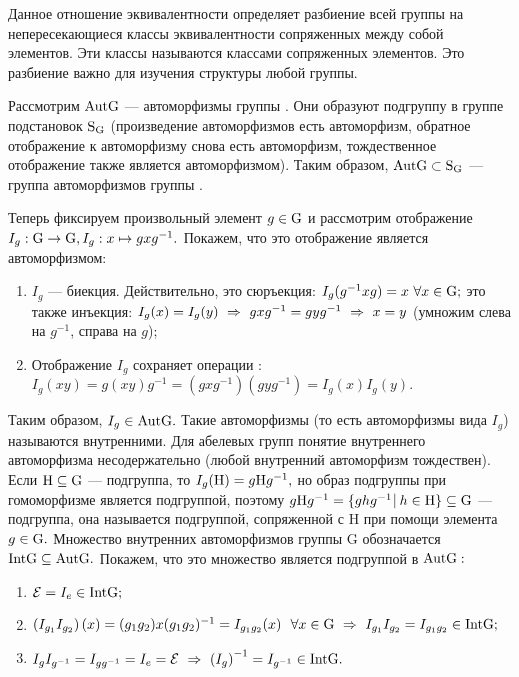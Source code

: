 \par Данное отношение эквивалентности определяет разбиение всей группы  на непересекающиеся классы эквивалентности сопряженных между собой элементов.
Эти классы называются классами сопряженных элементов. Это разбиение важно для изучения структуры любой группы.
\par Рассмотрим ${\rm Aut G}$ --- автоморфизмы группы . Они образуют подгруппу в группе подстановок ${\rm S_G}$ (произведение автоморфизмов есть автоморфизм,
обратное отображение к автоморфизму снова есть автоморфизм, тождественное отображение также является автоморфизмом). Таким образом,
${\rm Aut G}\subset{\rm S_G}$ --- группа автоморфизмов группы .
\par Теперь фиксируем произвольный элемент $g\in{\rm G}$ и рассмотрим отображение $I_g : {\rm G}\rightarrow {\rm G},\\ I_g : x\mapsto gxg^{-1}.$
Покажем, что это отображение является автоморфизмом:
\begin{enumerate}
    \item $I_g$ --- биекция.
    Действительно, это сюръекция: $I_g(g^{-1}xg)=x\ \forall x\in{\rm G};$ это также инъекция: $I_g(x)=I_g(y)\ \Rightarrow\  gxg^{-1}=gyg^{-1}\ \Rightarrow\  x=y$ (умножим слева на $g^{-1}$, справа на $g$);
    \item Отображение $I_g$ сохраняет операции : $I_g(xy)=g(xy)g^{-1}=(gxg^{-1})(gyg^{-1})=I_g(x)I_g(y).$
\end{enumerate}
\par Таким образом, $I_g\in {\rm Aut G}.$ Такие автоморфизмы (то есть автоморфизмы вида $I_g$) называются внутренними. Для абелевых групп понятие внутреннего автоморфизма несодержательно
(любой внутренний автоморфизм тождествен). Если ${\rm H\subseteq G}$ --- подгруппа, то $I_g({\rm H})=g{\rm H}g^{-1},$ но образ подгруппы при гомоморфизме является подгруппой,
поэтому $g\rr Hg^{-1}=\{ghg^{-1}\,\vrule\ h\in \rr H\}\subseteq\rr G$ --- подгруппа, она называется подгруппой, сопряженной с \rr H при помощи элемента $g\in{\rm G}.$
Множество внутренних автоморфизмов группы \rr G обозначается ${\rm Int G}\subseteq{\rm Aut G}.$ Покажем, что это множество является подгруппой в ${\rm Aut G}:$
\begin{enumerate}
    \item $\mathcal{E}=I_e\in{\rm Int G};$
    \item $\left(I_{g_1}I_{g_2}\right)(x)=(g_1g_2)x(g_1g_2)^{-1}=I_{g_1g_2}(x)\ \ \forall x\in\rr G\ra I_{g_1}I_{g_2}=I_{g_1g_2}\in\rr{Int G};$
    \item $I_gI_{g^{-1}}=I_{gg^{-1}}=I_e=\mathcal{E}\ \Rightarrow\  \left(I_g\right)^{-1}=I_{g^{-1}}\in {\rm Int G}.$
\end{enumerate}
